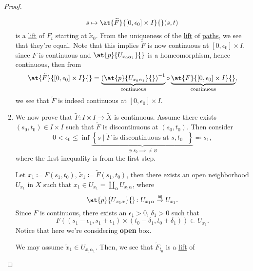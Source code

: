 \begin{proof}
\begin{enumerate}
		      \[
			      s\mapsto \at{\widetilde{F}}{[0, \epsilon _0]\times I}{}(s, t)
		      \]
		      is a \hyperref[prop:homotopy-lifting-property]{lift} of \(F_{t} \) starting at \(\widetilde{x} _0\). From the uniqueness of the
		      \hyperref[prop:homotopy-lifting-property]{lift} of \hyperref[def:path]{paths}, we see that they're equal. Note that this implies
		      \(\widetilde{F} \) is now continuous at \([0, \epsilon _0]\times I\), since \(F\) is continuous and \(\at{p}{U_{x_0 \alpha _1}}{}\) is a homeomorphism, hence continuous, then from
		      \[
			      \at{\widetilde{F} }{[0, \epsilon _0]\times I}{}
			      = \underbrace{\left(\at{p}{U_{x_0 \alpha _1}}{} \right)^{-1}}_{\text{continuous} }
			      \circ \underbrace{\vphantom{\left(\at{p}{U_{x_0 \alpha _1}}{} \right)^{-1}}\at{F}{[0, \epsilon _0]\times I}{}}_{\text{continuous}},
		      \]
		      we see that \(\widetilde{F} \) is indeed continuous at \([0, \epsilon _0]\times I\).
		\item We now prove that \(\widetilde{F} \colon I\times I\to \widetilde{X} \) is continuous. Assume there exists \((s_0, t_0)\in I\times I\) such that \(\widetilde{F} \) is
		      discontinuous at \((s_0, t_0)\). Then consider
		      \[
			      0 < \epsilon _0\leq \inf \underbrace{\left\{s\mid \widetilde{F} \text{ is discontinuous at \(s, t_0\) } \right\}}_{\ni s_0 \implies \neq \varnothing} \eqqcolon s_1,
		      \]
		      where the first inequality is from the first step.
		      \begin{figure}[H]
			      \centering
			      \label{fig:pf:col:lec14-6}
		      \end{figure}
		      Let \(x_1\coloneqq F(s_1, t_0)\), \(\widetilde{x} _1\coloneqq \widetilde{F} (s_1, t_0)\), then there exists an open neighborhood \(U_{x_1}\) in \(X\) such that
		      \(x_1\in U_{x_1} = \coprod_\alpha U_{x_1 \alpha }\), where
		      \[
			      \at{p}{U_{x_1 \alpha }}{}\colon U_{x_1 \alpha }\overset{\cong }{\to }U_{x_1}.
		      \]
		      Since \(F\) is continuous, there exists an \(\epsilon _1> 0\), \(\delta _1> 0\) such that
		      \[
			      F\left((s_1 - \epsilon _1, s_1 + \epsilon _1) \times (t_{0}-\delta _1, t_0 + \delta _1 )\right) \subset U_{x_1}.
		      \]
		      Notice that here we're considering \textbf{open} box.
		      \begin{figure}[H]
			      \centering
			      \label{fig:pf:col:lec14-7}
		      \end{figure}
		      We may assume \(\widetilde{x} _1\in U_{x_1 \alpha _1}\). Then, we see that \(\widetilde{F} _{t_0}\) is a \hyperref[prop:homotopy-lifting-property]{lift} of

\end{enumerate}
\end{proof}

